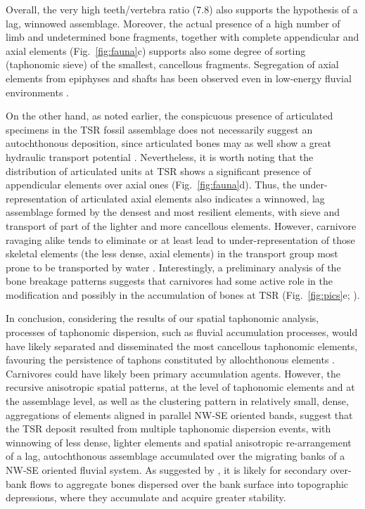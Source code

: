 \documentclass[5p,times,authoryear]{elsarticle}
\begin{document}
Overall, the very high teeth/vertebra ratio (7.8) also supports the hypothesis of a lag, winnowed assemblage. Moreover, the actual presence of a high number of limb and undetermined bone fragments, together with complete appendicular and axial elements (Fig.~\ref{fig:fauna}c) supports also some degree of sorting (taphonomic sieve) of the smallest, cancellous fragments. Segregation of axial elements from epiphyses and shafts has been observed even in low-energy fluvial environments \citep{Dominguez-Rodrigo2017}.

On the other hand, as noted earlier, the conspicuous presence of articulated specimens in the TSR fossil assemblage does not necessarily suggest an autochthonous deposition, since articulated bones may as well show a great hydraulic transport potential \citep{Coard1995,Coard1999}. Nevertheless, it is worth noting that the distribution of articulated units at TSR shows a significant presence of appendicular elements over axial ones (Fig.~\ref{fig:fauna}d). Thus, the under-representation of articulated axial elements also indicates a winnowed, lag assemblage formed by the densest and most resilient elements, with sieve and transport of part of the lighter and more cancellous elements. However, carnivore ravaging alike tends to eliminate or at least lead to under-representation of those skeletal elements (the less dense, axial elements) in the transport group most prone to be transported by water \citep{Voorhies1969,Dominguez-Rodrigo2012}. Interestingly, a preliminary analysis of the bone breakage patterns suggests that carnivores had some active role in the modification and possibly in the accumulation of bones at TSR (Fig.~\ref{fig:pics}e; \citealp{Konidaris2015}).

In conclusion, considering the results of our spatial taphonomic analysis, processes of taphonomic dispersion, such as fluvial accumulation processes, would have likely separated and disseminated the most cancellous taphonomic elements, favouring the persistence of taphons constituted by allochthonous elements \citep{Fernandez-Lopez2006}. Carnivores could have likely been primary accumulation agents. However, the recursive anisotropic spatial patterns, at the level of taphonomic elements and at the assemblage level, as well as the clustering pattern in relatively small, dense, aggregations of elements aligned in parallel NW-SE oriented bands, suggest that the TSR deposit resulted from multiple taphonomic dispersion events, with winnowing of less dense, lighter elements and spatial anisotropic re-arrangement of a lag, autochthonous assemblage accumulated over the migrating banks of a NW-SE oriented fluvial system. As suggested by \cite{Organista2017}, it is likely for secondary over-bank flows to aggregate bones dispersed over the bank surface into topographic depressions, where they accumulate and acquire greater stability.
\end{document}
